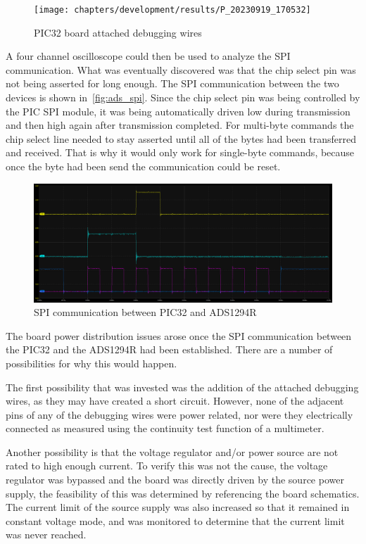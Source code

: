 \begin{figure}[!ht]
  \caption{PIC32 board attached debugging wires}\label{fig:pic_wires}
  \centering
  \texttt{[image: chapters/development/results/P\_20230919\_170532]}
\end{figure}

A four channel oscilloscope could then be used to analyze the SPI communication.
What was eventually discovered was that the chip select pin was not being asserted for long enough.
The SPI communication between the two devices is shown in~\autoref{fig:ads_spi}.
Since the chip select pin was being controlled by the PIC SPI module,
it was being automatically driven low during transmission and then high again after transmission completed.
For multi-byte commands the chip select line needed to stay asserted until all of the bytes had been transferred and received.
That is why it would only work for single-byte commands, because once the byte had been send the communication could be reset.

\begin{figure}[!ht]
  \caption{SPI communication between PIC32 and ADS1294R}\label{fig:ads_spi}
  \centering
  \includegraphics[width=1\columnwidth]{chapters/development/results/ADS_SPI_COMMS}
\end{figure}

The board power distribution issues arose once the SPI communication between the PIC32 and the ADS1294R had been established.
There are a number of possibilities for why this would happen.

The first possibility that was invested was the addition of the attached debugging wires, as they may have created a short circuit.
However, none of the adjacent pins of any of the debugging wires were power related,
nor were they electrically connected as measured using the continuity test function of a multimeter.

Another possibility is that the voltage regulator and/or power source are not rated to high enough current.
To verify this was not the cause, the voltage regulator was bypassed and the board was directly driven by the source power supply,
the feasibility of this was determined by referencing the board schematics.
The current limit of the source supply was also increased so that it remained in constant voltage mode,
and was monitored to determine that the current limit was never reached.


